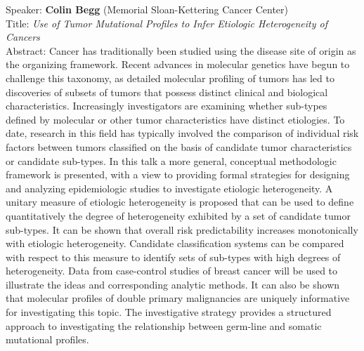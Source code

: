 \documentclass[11pt]{article}
\begin{document}
\bigskip
\noindent
Speaker: {\bf Colin Begg} (Memorial Sloan-Kettering Cancer Center)\\
Title: {\it Use of Tumor Mutational Profiles to Infer Etiologic Heterogeneity of Cancers}\\
Abstract: Cancer has traditionally been studied using the disease site
of origin as the organizing framework. Recent advances in molecular
genetics have begun to challenge this taxonomy, as detailed molecular
profiling of tumors has led to discoveries of subsets of tumors that
possess distinct clinical and biological characteristics. Increasingly
investigators are examining whether sub-types defined by molecular or
other tumor characteristics have distinct etiologies. To date,
research in this field has typically involved the comparison of
individual risk factors between tumors classified on the basis of
candidate tumor characteristics or candidate sub-types. In this talk a
more general, conceptual methodologic framework is presented, with a
view to providing formal strategies for designing and analyzing
epidemiologic studies to investigate etiologic heterogeneity. A
unitary measure of etiologic heterogeneity is proposed that can be
used to define quantitatively the degree of heterogeneity exhibited by
a set of candidate tumor sub-types. It can be shown that overall risk
predictability increases monotonically with etiologic
heterogeneity. Candidate classification systems can be compared with
respect to this measure to identify sets of sub-types with high
degrees of heterogeneity. Data from case-control studies of breast
cancer will be used to illustrate the ideas and corresponding analytic
methods. It can also be shown that molecular profiles of double
primary malignancies are uniquely informative for investigating this
topic. The investigative strategy provides a structured approach to
investigating the relationship between germ-line and somatic
mutational profiles.
\end{document}
